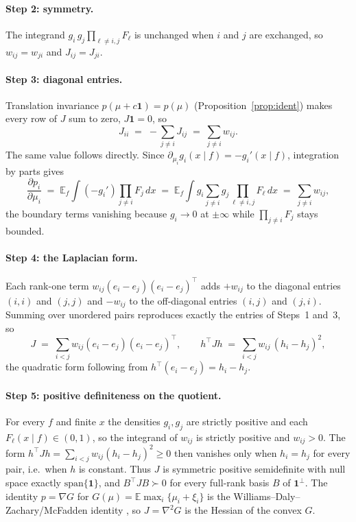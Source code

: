\documentclass[12pt]{article}
\theoremstyle{remark}
\newcommand{\E}{\mathbb{E}}
\begin{document}
\paragraph{Step 2: symmetry.} The integrand
$g_i\, g_j \prod_{\ell\ne i,j}F_\ell$ is unchanged when $i$ and $j$ are
exchanged, so $w_{ij}=w_{ji}$ and $J_{ij}=J_{ji}$.

\paragraph{Step 3: diagonal entries.} Translation invariance
$p(\mu+c\mathbf{1})=p(\mu)$ (Proposition~\ref{prop:ident}) makes every
row of $J$ sum to zero, $J\mathbf{1}=0$, so
\[
J_{ii} \;=\; -\sum_{j\ne i} J_{ij} \;=\; \sum_{j\ne i} w_{ij}.
\]
The same value follows directly. Since
$\partial_{\mu_i} g_i(x\mid f) = -g_i'(x\mid f)$, integration by parts gives
\[
\frac{\partial p_i}{\partial \mu_i}
\;=\; \E_f \int (-g_i')\prod_{j\ne i}F_j\,dx
\;=\; \E_f \int g_i \sum_{j\ne i} g_j \prod_{\ell\ne i,j}F_\ell\,dx
\;=\; \sum_{j\ne i} w_{ij},
\]
the boundary terms vanishing because $g_i\to 0$ at $\pm\infty$ while
$\prod_{j\ne i}F_j$ stays bounded.

\paragraph{Step 4: the Laplacian form.} Each rank-one term
$w_{ij}(e_i-e_j)(e_i-e_j)^\top$ adds $+w_{ij}$ to the diagonal entries
$(i,i)$ and $(j,j)$ and $-w_{ij}$ to the off-diagonal entries $(i,j)$ and
$(j,i)$. Summing over unordered pairs reproduces exactly the entries of
Steps~1 and~3, so
\[
J \;=\; \sum_{i<j} w_{ij}(e_i-e_j)(e_i-e_j)^\top,
\qquad
h^\top J h \;=\; \sum_{i<j} w_{ij}\,(h_i-h_j)^2 ,
\]
the quadratic form following from $h^\top(e_i-e_j) = h_i-h_j$.

\paragraph{Step 5: positive definiteness on the quotient.} For every $f$
and finite $x$ the densities $g_i, g_j$ are strictly positive and each
$F_\ell(x\mid f)\in(0,1)$, so the integrand of $w_{ij}$ is strictly
positive and $w_{ij}>0$. The form
$h^\top J h = \sum_{i<j} w_{ij}(h_i-h_j)^2 \ge 0$ then vanishes only when
$h_i=h_j$ for every pair, i.e.\ when $h$ is constant. Thus $J$ is
symmetric positive semidefinite with null space exactly
$\mathrm{span}\{\mathbf{1}\}$, and $B^\top J B \succ 0$ for every
full-rank basis $B$ of $\mathbf{1}^\perp$. The identity $p=\nabla G$ for
$G(\mu)=\E\max_i\{\mu_i+\xi_i\}$ is the Williams--Daly--Zachary/McFadden
identity \citep{williams1977,daly1978,mcfadden1981}, so $J=\nabla^2 G$ is
the Hessian of the convex $G$.
\end{document}
